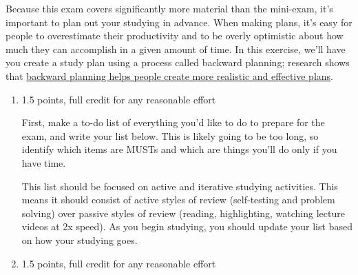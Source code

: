 \documentclass{article}
\makeatletter
\let\@href=\href
\renewcommand{\href}[2]{\@href{#1}{\ul{#2}}}
\makeatother
\begin{document}
\begin{enumerate}
  Because this exam covers significantly more material than the mini-exam, it's important to plan out your studying in advance. When making plans, it's easy for people to overestimate their productivity and to be overly optimistic about how much they can accomplish in a given amount of time. In this exercise, we'll have you create a study plan using a process called backward planning; research shows that \href{https://www.cambridge.org/core/journals/judgment-and-decision-making/article/backward-planning-effects-of-planning-direction-on-predictions-of-task-completion-time/92802E42B5A5D987CAADA7F582C2AE0F}{backward planning helps people create more realistic and effective plans}.

  \begin{enumerate}
  \item

    \begin{grading}
      1.5 points, full credit for any reasonable effort
    \end{grading}

    \begin{problem}[\vfill\newpage]
      First, make a to-do list of everything you’d like to do to prepare for the exam, and write your list below. This is likely going to be too long, so identify which items are MUSTs and which are things you'll do only if you have time.

      This list should be focused on active and iterative studying activities. This means it should consist of active styles of review (self-testing and problem solving) over passive styles of review (reading, highlighting, watching lecture videos at 2x speed). As you begin studying, you should update your list based on how your studying goes. 
    \end{problem}

  \item

    \begin{grading}
      1.5 points, full credit for any reasonable effort
    \end{grading}


\end{enumerate}
\end{enumerate}
\end{document}
